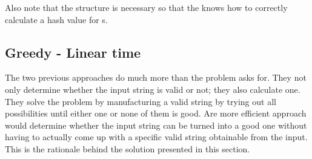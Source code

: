  Also note that the structure  is necessary so that the  knows how to  correctly calculate a hash value for  s. 

\subsection{Greedy - Linear time}
\label{valid_parenthesis:sec:linear}
The two previous approaches do much more than the problem asks for. They not only determine whether the input string is valid or not; they also calculate one. They solve the problem by manufacturing a valid string by trying out all possibilities until either one or none of them is good. Are more efficient approach would determine  whether the input string can be turned into a good one without having to actually come up with a specific valid string obtainable from the input.  This is the rationale behind the solution presented in this section.

